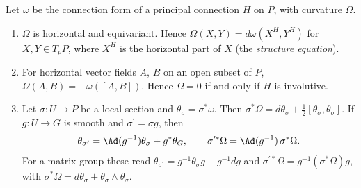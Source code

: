 \begin{proposition}\label{connections:proposition-principal-curvature}
Let $\omega$ be the connection form of a principal connection $H$ on $P$, with curvature $\Omega$.
\begin{enumerate}
\item $\Omega$ is horizontal and equivariant. Hence $\Omega(X, Y) = d\omega(X^H, Y^H)$ for $X, Y \in T_pP$, where $X^H$ is the horizontal part of $X$ (the \emph{structure equation}).
\item For horizontal vector fields $A$, $B$ on an open subset of $P$, $\Omega(A, B) = -\omega([A, B])$. Hence $\Omega = 0$ if and only if $H$ is involutive.
\item Let $\sigma \colon U \to P$ be a local section and $\theta_\sigma = \sigma^*\omega$. Then $\sigma^*\Omega = d\theta_\sigma + \frac12[\theta_\sigma, \theta_\sigma]$. If $g \colon U \to G$ is smooth and
$\sigma^{\prime} = \sigma g$, then
\[
\theta_{\sigma^{\prime}} = \Ad(g^{-1})\theta_\sigma + g^*\theta_G, \qquad \sigma^{\prime*}\Omega = \Ad(g^{-1})\,\sigma^*\Omega .
\]
For a matrix group these read $\theta_{\sigma^{\prime}} = g^{-1}\theta_\sigma g + g^{-1}dg$ and $\sigma^{\prime*}\Omega = g^{-1}(\sigma^*\Omega)g$, with $\sigma^*\Omega = d\theta_\sigma + \theta_\sigma \wedge \theta_\sigma$.
\end{enumerate}
\end{proposition}

